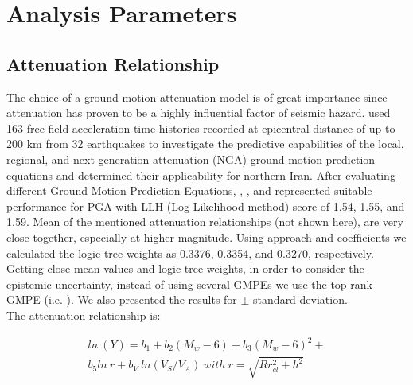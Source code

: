 
\section{Analysis Parameters}
\subsection{Attenuation Relationship}
The choice of a ground motion attenuation model is of great importance since attenuation has proven to be a highly influential factor of seismic hazard. \citet{Zafarani2014} used 163 free-field acceleration time histories recorded at epicentral distance of up to 200 km from 32 earthquakes to investigate the predictive capabilities of the local, regional, and next generation attenuation (NGA) ground-motion prediction equations and determined their applicability for northern Iran. After evaluating different Ground Motion Prediction Equations, \citet{Kalkan2004}, \citet{Chiou2008}, and \citet{Boore2008} represented suitable performance for  PGA  with LLH (Log-Likelihood method) score of 1.54, 1.55, and 1.59. Mean of the mentioned attenuation relationships (not shown here), are very close together, especially at higher magnitude. Using \citet{Scherbaum2009} approach and \citet{Zafarani2014} coefficients we calculated the logic tree weights as 0.3376, 0.3354, and 0.3270, respectively. Getting close mean values and logic tree weights, in order to consider the epistemic uncertainty, instead of using several GMPEs we use the top rank GMPE (i.e.  \citet{Kalkan2004} ). We also presented the results for  $\pm$ standard deviation. \\

\noindent
The attenuation relationship is:

\begin{equation}
\begin{split}
ln\ (Y) = b_1 + b_2(M_w-6) + b_3( M_w-6)^{2}+  \\ 
b_5ln\ r + b_V \ ln(V_S/V_A) \  with \  r= \sqrt{R{r^2_{cl} + h^2}}  
\end{split}
\end{equation}

